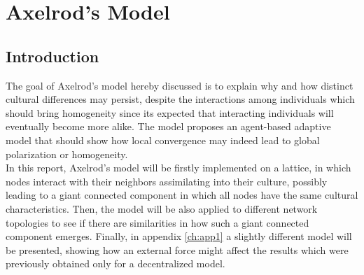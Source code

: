 \chapter{Axelrod's Model}\label{ch:1}



\section{Introduction}
 




The goal of Axelrod's model \cite{axelrod_dissemination_1997} hereby discussed is to explain why and how distinct cultural differences may persist, despite the interactions among individuals which should bring homogeneity since its expected that interacting individuals will eventually become more alike. The model proposes an agent-based adaptive model that should show how local convergence may indeed lead to global polarization or homogeneity.  \\
In this report, Axelrod's model will be firstly implemented on a lattice, in which nodes interact with their neighbors assimilating into their culture, possibly leading to a giant connected component in which all nodes have the same cultural characteristics. Then, the model will be also applied to different network topologies to see if there are similarities in how such a giant connected component emerges. Finally, in appendix \ref{ch:app1} a slightly different model will be presented, showing how an external force might affect the results which were previously obtained only for a decentralized model.


